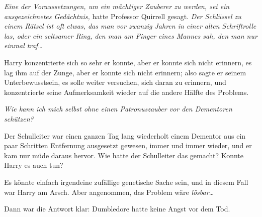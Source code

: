 \emph{Eine der Voraussetzungen, um ein mächtiger Zauberer zu werden, sei ein ausgezeichnetes Gedächtnis,} hatte Professor Quirrell gesagt. \emph{Der Schlüssel zu einem Rätsel ist oft etwas, das man vor zwanzig Jahren in einer alten Schriftrolle las, oder ein seltsamer Ring, den man am Finger eines Mannes sah, den man nur einmal traf…}

Harry konzentrierte sich so sehr er konnte, aber er konnte sich nicht erinnern, es lag ihm auf der Zunge, aber er konnte sich nicht erinnern; also sagte er seinem Unterbewusstsein, es solle weiter versuchen, sich daran zu erinnern, und konzentrierte seine Aufmerksamkeit wieder auf die andere Hälfte des Problems.

\emph{Wie kann ich mich selbst ohne einen Patronuszauber vor den Dementoren schützen?}

Der Schulleiter war einen ganzen Tag lang wiederholt einem Dementor aus ein paar Schritten Entfernung ausgesetzt gewesen, immer und immer wieder, und er kam nur müde daraus hervor. Wie hatte der Schulleiter das gemacht? Konnte Harry es auch tun?

Es könnte einfach irgendeine zufällige genetische Sache sein, und in diesem Fall war Harry am Arsch. Aber angenommen, das Problem wäre \emph{lösbar}…

Dann war die Antwort klar: Dumbledore hatte keine Angst vor dem Tod.

